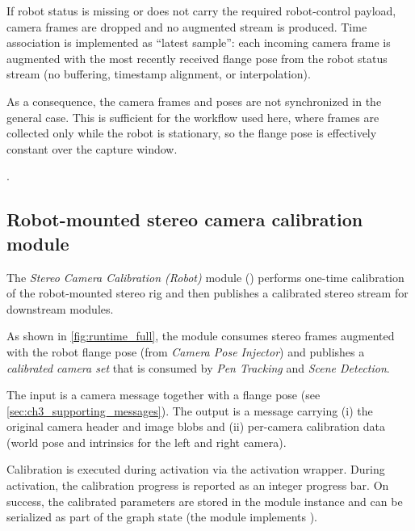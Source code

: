 If robot status is missing or does not carry the required robot-control payload, camera frames are dropped and no augmented stream is produced.
Time association is implemented as ``latest sample'': each incoming camera frame is augmented with the most recently received flange pose from the robot status stream (no buffering, timestamp alignment, or interpolation).

As a consequence, the camera frames and poses are not synchronized in the general case.
This is sufficient for the workflow used here, where frames are collected only while the robot is stationary, so the flange pose is effectively constant over the capture window.

.

\subsection{Robot-mounted stereo camera calibration module}
\label{subsec:ch4_mod_camera_calibration}

The \emph{Stereo Camera Calibration (Robot)} module () performs one-time calibration of the robot-mounted stereo rig and then publishes a calibrated stereo stream for downstream modules.

As shown in \autoref{fig:runtime_full}, the module consumes stereo frames augmented with the robot flange pose (from \emph{Camera Pose Injector}) and publishes a \emph{calibrated camera set} that is consumed by \emph{Pen Tracking} and \emph{Scene Detection}.

The input is a camera message together with a flange pose (see \autoref{sec:ch3_supporting_messages}). The output is a  message carrying (i) the original camera header and image blobs and (ii) per-camera calibration data (world pose and intrinsics for the left and right camera).

Calibration is executed during activation via the activation wrapper.
During activation, the calibration progress is reported as an integer progress bar.
On success, the calibrated parameters are stored in the module instance and can be serialized as part of the graph state (the module implements ).

